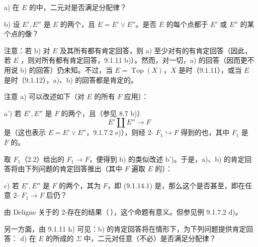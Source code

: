 a) 在 $E$ 的中，二元对是否满足分配律？

b) 设 $E',E''$ 是 $E$ 的两个，且 $E=E'\vee E''$。是否 $E$ 的每个点都于 $E'$ 或 $E''$ 的某个点的像？

注意：若 b) 对 $E$ 及其所有都有肯定回答，则 a) 至少对有的有肯定回答（因此，若 $E$ ，则对所有都有肯定回答，9.1.11 b)）。然而，对一切，a) 的回答（因而更不用说 b) 的回答）仍未知。不过，当 $E=\operatorname{Top}(X)$，$X$ 是时（9.1.11），或当 $E$ 是时（9.1.12），a)、b) 的回答都是肯定的。

注意 a) 可以改述如下（对 $E$ 的所有 $F$ 应用）：

a') 若 $E',E''$ 是 $F$ 的两个，且（参见 8.7 b)）
\[
E'\amalg E''\longrightarrow F\tag{9.1.14.1}
\]
是（这也表示 $E=E'\vee E''$，9.1.7.2 e)），则经 $2$- $F_1\hookrightarrow F$ 得到的也，其中 $F_1$ 是 $F$ 的。

取 $F_1$（2.2）给出的 $F_1\to F$，便得到 b) 的类似改述 b')。于是，a)、b) 的肯定回答将由下列问题的肯定回答推出（其中 $F$ 遍取 $E$ 的）：

c) 若 $E',E''$ 是 $F$ 的两个，其为 $F$，即 (9.1.14.1) 是，那么这个是否甚至，即在任意 $2$- $F_1\to F$ 后仍？

由 Deligne 关于的 $2$-存在的结果（\,），这个命题有意义。但参见例 9.1.7.2 d)。

另一方面，由 9.1.11 h) 可见：b) 的肯定回答将在情形下，为下列问题提供肯定回答：
d) 在 $E$ 的所成的 $\Sigma$ 中，二元对任意（不必）是否满足分配律？

